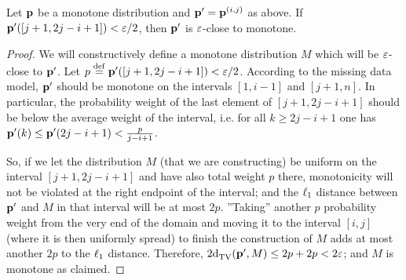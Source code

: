 \begin{lemma}\label{lemma:consec:intervals:close}
  Let $\D$ be a monotone distribution and $\D^\prime=\D^{(i,j)}$ as above. If $\D^\prime([j+1,2j-i+1])<\eps/2$, then $\D^\prime$ is $\eps$-close to monotone.\end{lemma}
\begin{proof}
  We will constructively define a monotone distribution $M$ which will be $\eps$-close to $\D^\prime$. Let $p\eqdef\D^\prime([j+1,2j-i+1])<\eps/2$. According to the missing data model, $\D^\prime$ should be monotone on the intervals $[1,i-1]$ and $[j+1,n]$. In particular, the probability weight of the last element of $[j+1,2j-i+1]$ should be below the average weight of the interval, i.e. for all $k \geq 2j-i+1$ one has $\D^\prime(k) \leq \D^\prime(2j-i+1)<\frac{p}{j-i+1}$.

  So, if we let the distribution $M$ (that we are constructing) be uniform on the interval $[j+1,2j-i+1]$ and have also total weight $p$ there, monotonicity will not be violated at the right endpoint of the interval; and the $\lp[1]$ distance between $\D^\prime$ and $M$ in that interval will be at most $2p$. ''Taking'' another $p$ probability weight from the very end of the domain and moving it to the interval $[i,j]$ (where it is then uniformly spread) to finish the construction of $M$ adds at most another $2p$ to the $\lp[1]$ distance. Therefore,
  $2\totalvardist{\D^\prime}{M}\leq 2p +2p < 2\eps$; and $M$ is monotone as claimed.  
\end{proof}


